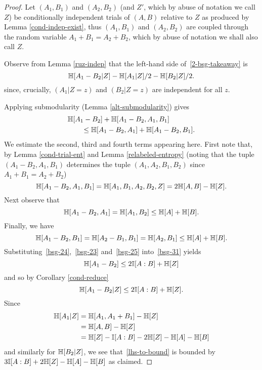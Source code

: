 \begin{proof}
  \leanok
Let $(A_1, B_1)$ and $(A_2, B_2)$ (and $Z'$, which by abuse of notation we call $Z$) be conditionally independent trials of $(A,B)$ relative to $Z$ as produced by Lemma \ref{cond-indep-exist}, thus $(A_1,B_1)$ and $(A_2,B_2)$ are coupled through the random variable $A_1 + B_1 = A_2 + B_2$, which by abuse of notation we shall also call $Z$.

Observe from Lemma \ref{ruz-indep} that the left-hand side of~\eqref{2-bsg-takeaway} is
\begin{equation}\label{lhs-to-bound}
\mathbb{H}[A_1 - B_2| Z] - \mathbb{H}[A_1 | Z]/2 - \mathbb{H}[B_2 | Z]/2.
\end{equation}
since, crucially, $(A_1 | Z=z)$ and $(B_2 | Z=z)$ are independent for all $z$.

Applying submodularity (Lemma \ref{alt-submodularity}) gives
\begin{equation}\label{bsg-31} \begin{split}
&\mathbb{H}[A_1 - B_2] + \mathbb{H}[A_1 - B_2, A_1, B_1] \\
&\qquad \leq \mathbb{H}[A_1 - B_2, A_1] + \mathbb{H}[A_1 - B_2,B_1].
\end{split}\end{equation}
We estimate the second, third and fourth terms appearing here.
First note that, by Lemma \ref{cond-trial-ent} and Lemma \ref{relabeled-entropy} (noting that the tuple $(A_1 - B_2, A_1, B_1)$  determines the tuple $(A_1, A_2, B_1, B_2)$ since $A_1+B_1=A_2+B_2$)
\begin{equation}\label{bsg-24} \mathbb{H}[A_1 - B_2, A_1, B_1] = \mathbb{H}[A_1, B_1, A_2, B_2,Z] = 2\mathbb{H}[A,B] - \mathbb{H}[Z].\end{equation}
Next observe that
\begin{equation}\label{bsg-23} \mathbb{H}[A_1 - B_2, A_1] = \mathbb{H}[A_1, B_2] \leq \mathbb{H}[A] + \mathbb{H}[B].
\end{equation}
Finally, we have
\begin{equation}\label{bsg-25} \mathbb{H}[A_1 - B_2, B_1] = \mathbb{H}[A_2 - B_1, B_1] = \mathbb{H}[A_2, B_1] \leq \mathbb{H}[A] + \mathbb{H}[B].\end{equation}
Substituting~\eqref{bsg-24},~\eqref{bsg-23} and~\eqref{bsg-25} into~\eqref{bsg-31} yields
\[\mathbb{H}[A_1 - B_2] \leq 2 \mathbb{I}[A:B] + \mathbb{H}[Z]\] and so by Corollary \ref{cond-reduce}
\[\mathbb{H}[A_1 - B_2 | Z]  \leq 2 \mathbb{I}[A:B] + \mathbb{H}[Z].\]
Since
\begin{align*} \mathbb{H}[A_1 | Z] & = \mathbb{H}[A_1, A_1 + B_1] - \mathbb{H}[Z] \\ & = \mathbb{H}[A,B] - \mathbb{H}[Z] \\ & = \mathbb{H}[Z] -  \mathbb{I}[A:B] - 2 \mathbb{H}[Z]- \mathbb{H}[A]-\mathbb{H}[B]\end{align*}
and similarly for $\mathbb{H}[B_2 | Z]$, we see that~\eqref{lhs-to-bound} is bounded by
$3 \mathbb{I}[A:B] + 2\mathbb{H}[Z]-\mathbb{H}[A]-\mathbb{H}[B]$ as claimed.
\end{proof}


